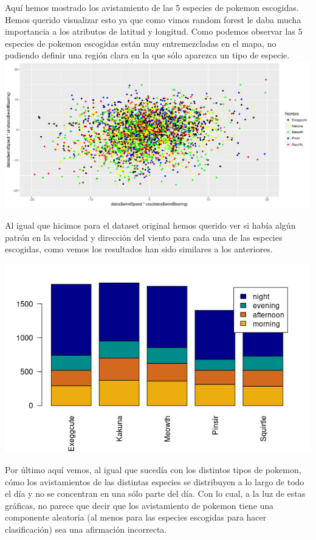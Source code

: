 Aquí hemos mostrado los avistamiento de las 5 especies de pokemon escogidas. Hemos querido visualizar esto ya que como vimos random forest le daba mucha importancia a los atributos de latitud y longitud. Como podemos observar las 5 especies de pokemon escogidas están muy entremezcladas en el mapa, no pudiendo definir una región clara en la que sólo aparezca un tipo de especie.\\

\includegraphics[width = \textwidth]{img/vientoFiltrado.pdf}

Al igual que hicimos para el dataset original hemos querido ver si había algún patrón en la velocidad y dirección del viento para cada una de las especies escogidas, como vemos los resultados han sido similares a los anteriores.

\includegraphics[width = \textwidth]{img/parteDiaFiltrado.png}

Por último aquí vemos, al igual que sucedía con los distintos tipos de pokemon, cómo los avistamientos de las distintas especies se distribuyen a lo largo de todo el día y no se concentran en una sólo parte del día. Con lo cual, a la luz de estas gráficas, no parece que decir que los avistamiento de pokemon tiene una componente aleatoria (al menos para las especies escogidas para hacer clasificación) sea una afirmación incorrecta.